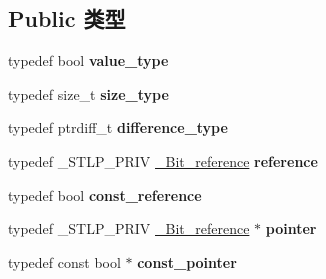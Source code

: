 \subsection*{Public 类型}
\begin{DoxyCompactItemize}
\item 
\mbox{\label{class_____b_v_e_c_t_o_r___q_u_a_l_i_f_i_e_d_a1637661b5a2e1149950b75987cc05cea}} 
typedef bool {\bfseries value\+\_\+type}
\item 
\mbox{\label{class_____b_v_e_c_t_o_r___q_u_a_l_i_f_i_e_d_a4f14d9fd0d19345235392b51ea93e1be}} 
typedef size\+\_\+t {\bfseries size\+\_\+type}
\item 
\mbox{\label{class_____b_v_e_c_t_o_r___q_u_a_l_i_f_i_e_d_af3bb401c644358bcf6e258e2e3bcb5e4}} 
typedef ptrdiff\+\_\+t {\bfseries difference\+\_\+type}
\item 
\mbox{\label{class_____b_v_e_c_t_o_r___q_u_a_l_i_f_i_e_d_a971d52726648a85d5f1eeef377194a73}} 
typedef \+\_\+\+S\+T\+L\+P\+\_\+\+P\+R\+IV \hyperlink{struct___bit__reference}{\+\_\+\+Bit\+\_\+reference} {\bfseries reference}
\item 
\mbox{\label{class_____b_v_e_c_t_o_r___q_u_a_l_i_f_i_e_d_a83150823c3e2720b1b499129ef1a5c9c}} 
typedef bool {\bfseries const\+\_\+reference}
\item 
\mbox{\label{class_____b_v_e_c_t_o_r___q_u_a_l_i_f_i_e_d_a96cc327856591973e662c196a7d5e9a7}} 
typedef \+\_\+\+S\+T\+L\+P\+\_\+\+P\+R\+IV \hyperlink{struct___bit__reference}{\+\_\+\+Bit\+\_\+reference} $\ast$ {\bfseries pointer}
\item 
\mbox{\label{class_____b_v_e_c_t_o_r___q_u_a_l_i_f_i_e_d_a8f06d21385c68d3835abf48438ecb1bd}} 
typedef const bool $\ast$ {\bfseries const\+\_\+pointer}
\item 
\mbox{\label{class_____b_v_e_c_t_o_r___q_u_a_l_i_f_i_e_d_ab1726c639577f05b275fc85fcfdf9a3f}} 

\end{DoxyCompactItemize}
